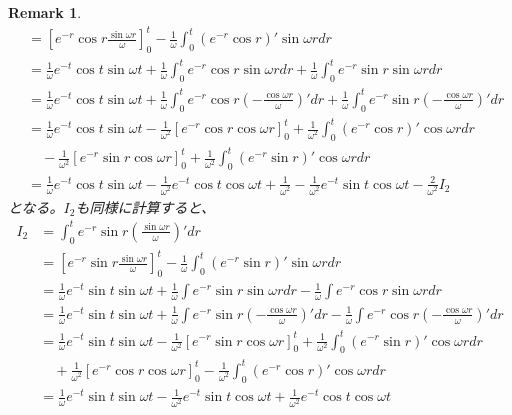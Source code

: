 \documentclass{jsarticle}
\newtheorem{remark}{Remark}
\begin{document}
\begin{remark}
\begin{align}
&=\left[e^{-r}\cos r\frac{\sin\omega r}{\omega}\right]_{0}^{t}
-\frac{1}{\omega}\int_{0}^{t}\left(e^{-r}\cos r\right)'\sin\omega rdr\\
&=\frac{1}{\omega}e^{-t}\cos t\sin\omega t
+\frac{1}{\omega}\int_{0}^{t}e^{-r}\cos r\sin\omega rdr
+\frac{1}{\omega}\int_{0}^{t}e^{-r}\sin r\sin\omega rdr\\
&=\frac{1}{\omega}e^{-t}\cos t\sin\omega t
+\frac{1}{\omega}\int_{0}^{t}e^{-r}\cos r\left(-\frac{\cos\omega r}{\omega}\right)'dr
+\frac{1}{\omega}\int_{0}^{t}e^{-r}\sin r\left(-\frac{\cos\omega r}{\omega}\right)'dr\\
&=\frac{1}{\omega}e^{-t}\cos t\sin\omega t
-\frac{1}{\omega^{2}}\left[e^{-r}\cos r\cos\omega r\right]_{0}^{t}
+\frac{1}{\omega^{2}}\int_{0}^{t}\left(e^{-r}\cos r\right)'\cos\omega rdr\\
&\quad-\frac{1}{\omega^{2}}\left[e^{-r}\sin r\cos\omega r\right]_{0}^{t}
+\frac{1}{\omega^{2}}\int_{0}^{t}\left(e^{-r}\sin r\right)'\cos\omega rdr\\
&=\frac{1}{\omega}e^{-t}\cos t\sin\omega t
-\frac{1}{\omega^{2}}e^{-t}\cos t\cos\omega t
+\frac{1}{\omega^{2}}
-\frac{1}{\omega^{2}}e^{-t}\sin t\cos\omega t
-\frac{2}{\omega^{2}}I_{2}
\end{align}
となる。$I_{2}$も同様に計算すると、
\begin{align}
I_{2}&=\int_{0}^{t}e^{-r}\sin r\left(\frac{\sin\omega r}{\omega}\right)'dr\\
&=\left[e^{-r}\sin r\frac{\sin\omega r}{\omega}\right]_{0}^{t}
-\frac{1}{\omega}\int_{0}^{t}\left(e^{-r}\sin r\right)'\sin\omega rdr\\
&=\frac{1}{\omega}e^{-t}\sin t\sin\omega t
+\frac{1}{\omega}\int e^{-r}\sin r\sin\omega rdr
-\frac{1}{\omega}\int e^{-r}\cos r\sin\omega rdr\\
&=\frac{1}{\omega}e^{-t}\sin t\sin\omega t
+\frac{1}{\omega}\int e^{-r}\sin r\left(-\frac{\cos\omega r}{\omega}\right)'dr
-\frac{1}{\omega}\int e^{-r}\cos r\left(-\frac{\cos\omega r}{\omega}\right)'dr\\
&=\frac{1}{\omega}e^{-t}\sin t\sin\omega t
-\frac{1}{\omega^{2}}\left[e^{-r}\sin r\cos\omega r\right]_{0}^{t}
+\frac{1}{\omega^{2}}\int_{0}^{t}\left(e^{-r}\sin r\right)'\cos\omega rdr\\
&\quad
+\frac{1}{\omega^{2}}\left[e^{-r}\cos r\cos\omega r\right]_{0}^{t}
-\frac{1}{\omega^{2}}\int_{0}^{t}\left(e^{-r}\cos r\right)'\cos\omega rdr\\
&=\frac{1}{\omega}e^{-t}\sin t\sin\omega t
-\frac{1}{\omega^{2}}e^{-t}\sin t\cos\omega t
+\frac{1}{\omega^{2}}e^{-t}\cos t\cos\omega t

\end{align}
\end{remark}
\end{document}
